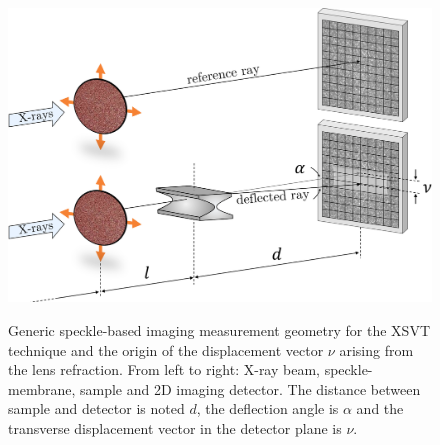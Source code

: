 \begin{refsection}
\begin{figure}[t]
        \centering
        {\includegraphics[width=0.7\linewidth]{figures/ch04/speckle_tracking2.pdf}}
        \caption[Speckle-based imaging geometry]{Generic speckle-based imaging measurement geometry for the XSVT technique and the origin of the displacement vector $\nu$ arising from the lens refraction. From left to right: X-ray beam, speckle-membrane, sample and 2D imaging detector. The distance between sample and detector is noted $d$, the deflection angle is $\alpha$ and the transverse displacement vector in the detector plane is $\nu$.} \label{fig:speckle_tracking2}
\end{figure}


\end{refsection}
